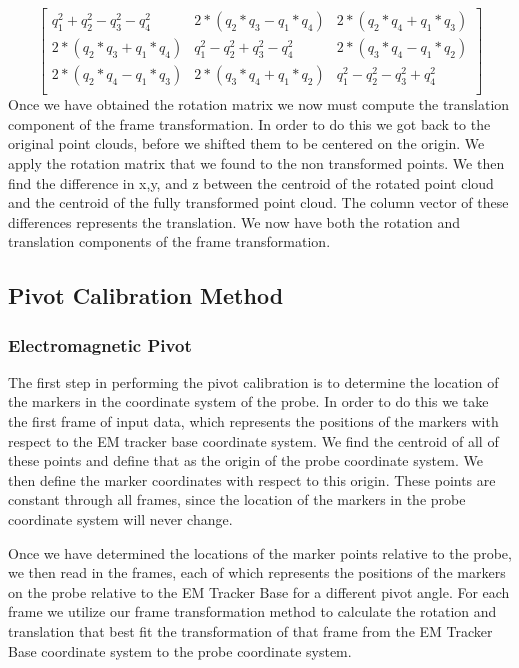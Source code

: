 \documentclass[a4paper]{article}
\begin{document}
\[
\begin{bmatrix}
    q_1^2 + q_2^2 - q_3^2 - q_4^2 & 2*(q_2*q_3 - q_1*q_4) & 2*(q_2*q_4 + q_1*q_3)\\
    2*(q_2*q_3 + q_1*q_4) & q_1^2 - q_2^2 + q_3^2 - q_4^2 & 2*(q_3*q_4 - q_1*q_2)\\
    2*(q_2*q_4 - q_1*q_3) & 2*(q_3*q_4 + q_1*q_2) & q_1^2 - q_2^2 - q_3^2 + q_4^2 \\
\end{bmatrix}
\]
Once we have obtained the rotation matrix we now must compute the translation component of the frame transformation. In order to do this we got back to the original point clouds, before we shifted them to be centered on the origin. We apply the rotation matrix that we found to the non transformed points. We then find the difference in x,y, and z between the centroid of the rotated point cloud and the centroid of the fully transformed point cloud. The column vector of these differences represents the translation. We now have both the rotation and translation components of the frame transformation. 
\subsection{Pivot Calibration Method}
\subsubsection{Electromagnetic Pivot}

The first step in performing the pivot calibration is to determine the location of the markers in the coordinate system of the probe. In order to do this we take the first frame of input data, which represents the positions of the markers with respect to the EM tracker base coordinate system. We find the centroid of all of these points and define that as the origin of the probe coordinate system. We then define the marker coordinates with respect to this origin. These points are constant through all frames, since the location of the markers in the probe coordinate system will never change. 

Once we have determined the locations of the marker points relative to the probe, we then read in the frames, each of which represents the positions of the markers on the probe relative to the EM Tracker Base for a different pivot angle. For each frame we utilize our frame transformation method to calculate the rotation and translation that best fit the transformation of that frame from the EM Tracker Base coordinate system to the probe coordinate system. 
\end{document}
